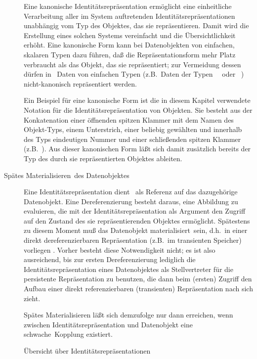 \begin{description}
Eine kanonische Identit\"{a}tsrepr\"{a}sentation erm\"{o}glicht eine
einheitliche Verarbeitung aller im System auftretenden
Identit\"{a}tsrepr\"{a}sentationen unabh\"{a}ngig vom Typ des Objektes, das sie
repr\"{a}sentieren. Damit wird die Erstellung eines solchen Systems
vereinfacht und die \"{U}bersichtlichkeit erh\"{o}ht. Eine kanonische Form
kann bei Datenobjekten von einfachen, skalaren Typen dazu f\"{u}hren,
da\ss{} die Re\-pr\"{a}\-sen\-ta\-tions\-form mehr Platz verbraucht als das
Objekt, das sie repr\"{a}sentiert; zur Vermeidung dessen d\"{u}rfen in
\cl\ Daten von einfachen Typen (z.B.\ Daten der Typen
\ \ oder \ )
nicht-kanonisch repr\"{a}sentiert werden.
%
\par{}Ein Beispiel f\"{u}r eine kanonische Form ist die in diesem Kapitel
verwendete Notation f\"{u}r die Identit\"{a}tsrepr\"{a}sentation von
Objekten. Sie besteht aus der Konkatenation einer \"{o}ff\-nen\-den
spitzen Klammer mit dem Namen des Objekt-Typs, einem Unterstrich,
einer beliebig ge\-w\"{a}hl\-ten und innerhalb des Typs eindeutigen
Nummer und einer schlie\ss{}enden spitzen Klammer
(z.B.\ ).  Aus dieser kanonischen Form
l\"{a}\ss{}t sich damit zus\"{a}tzlich bereits der Typ des durch sie
repr\"{a}sentierten Objektes ableiten.
%
\item[Sp\"{a}tes \rglq{}Materialisieren\rgrq\ des Datenobjektes] Eine
Identit\"{a}tsrepr\"{a}sentation dient \ua\ als Referenz auf das
dazugeh\"{o}rige Datenobjekt. Eine Dereferenzierung besteht daraus, eine
Abbildung zu evaluieren, die mit der Identit\"{a}tsrepr\"{a}sentation als
Argument den Zugriff auf den Zustand des sie repr\"{a}sentierenden
Objektes erm\"{o}glicht. Sp\"{a}testens zu diesem Moment mu\ss{} das
Datenobjekt \rglq{}materialisiert\rgrq\ sein, d.h.\ in einer direkt
dereferenzierbaren Repr\"{a}sentation (z.B.\ im transienten Speicher)
vorliegen \cite[]{bib:he89}. Vorher besteht diese
Notwendigkeit nicht; es ist also ausreichend, bis zur ersten
Dereferenzierung lediglich die Identit\"{a}tsrepr\"{a}sentation eines
Datenobjektes als Stellvertreter f\"{u}r die persistente Repr\"{a}sentation
zu benutzen, die dann beim (ersten) Zugriff den Aufbau einer direkt
referenzierbaren (transienten) Repr\"{a}sentation nach sich zieht.
%
\par{}Sp\"{a}tes Materialisieren l\"{a}\ss{}t sich demzufolge nur dann
erreichen, wenn zwischen Iden\-ti\-t\"{a}ts\-re\-pr\"{a}\-sen\-ta\-tion und
Datenobjekt eine \rglq{}schwache\rgrq\ Kopplung existiert.
%
\end{description}
%
\begin{figure}[htbp]%
\ifbuch%
\centerline{}%
\else%
\centerline{}%
\fi%
\captionfrom%
 {\"{U}bersicht \"{u}ber Identit\"{a}tsrepr\"{a}sentationen}%
 {\cite[]{bib:ko90}}%
\label{fig:idtaxon}%
\end{figure}%
%
